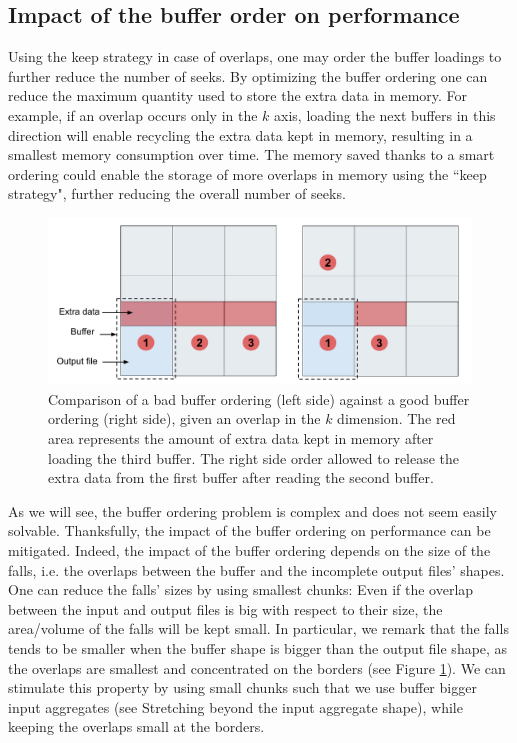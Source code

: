 \documentclass[conference]{IEEEtran}
\begin{document}
\subsection{Impact of the buffer order on performance}
Using the keep strategy in case of overlaps, one may order the buffer loadings to further reduce the number of seeks.
By optimizing the buffer ordering one can reduce the maximum quantity used to store the extra data in memory.
For example, if an overlap occurs only in the $k$ axis, loading the next buffers in this direction will enable recycling the extra data kept in memory, resulting in a smallest memory consumption over time.
The memory saved thanks to a smart ordering could enable the storage of more overlaps in memory using the ``keep strategy", further reducing the overall number of seeks. \\

\begin{figure}[h]
\includegraphics[scale=0.2]{./figures/goodorderingbadordering.png}
\caption{ Comparison of a bad buffer ordering (left side) against a good buffer ordering (right side), given an overlap in the $k$ dimension.
The red area represents the amount of extra data kept in memory after loading the third buffer.
The right side order allowed to release the extra data from the first buffer after reading the second buffer.
}
\label{fig:goodorderingbadordering}
\end{figure}

As we will see, the buffer ordering problem is complex and does not seem easily solvable.
Thanksfully, the impact of the buffer ordering on performance can be mitigated.
Indeed, the impact of the buffer ordering depends on the size of the falls, i.e. the overlaps between the buffer and the incomplete output files' shapes.
One can reduce the falls' sizes by using smallest chunks:
Even if the overlap between the input and output files is big with respect to their size, the area/volume of the falls will be kept small.
In particular, we remark that the falls tends to be smaller when the buffer shape is bigger than the output file shape, as the overlaps are smallest and concentrated on the borders (see Figure \ref{fig:goodorderingbadordering}).
We can stimulate this property by using small chunks such that we use buffer bigger input aggregates (see Stretching beyond the input aggregate shape), while keeping the overlaps small at the borders.
\end{document}
